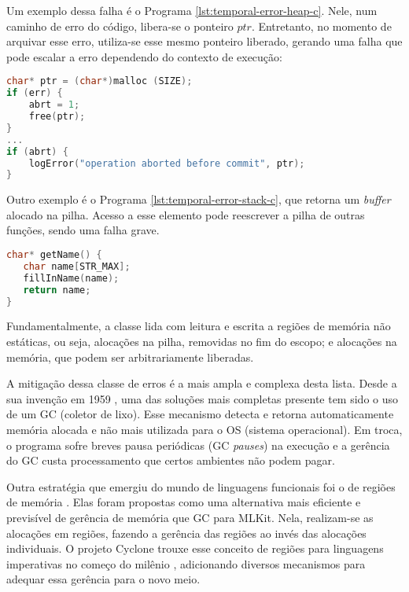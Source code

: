 Um exemplo dessa falha é o Programa \ref{lst:temporal-error-heap-c}. Nele, num caminho de erro do código, libera-se o ponteiro $ptr$. Entretanto, no momento de arquivar esse erro, utiliza-se esse mesmo ponteiro liberado, gerando uma falha que pode escalar a erro dependendo do contexto de execução:
\begin{lstlisting}[language=C, label={lst:temporal-error-heap-c}, caption=Exemplo de uma Falha Temporal na \emph{Heap}]
char* ptr = (char*)malloc (SIZE);  
if (err) {
	abrt = 1;  
	free(ptr);
}  
...  
if (abrt) {
	logError("operation aborted before commit", ptr);
}
\end{lstlisting}

Outro exemplo é o Programa \ref{lst:temporal-error-stack-c}, que retorna um \emph{buffer} alocado na pilha. Acesso a esse elemento pode reescrever a pilha de outras funções, sendo uma falha grave.

\begin{lstlisting}[language=C, label={lst:temporal-error-stack-c}, caption=Exemplo de uma Falha Temporal na Pilha]
char* getName() {
   char name[STR_MAX];  
   fillInName(name);  
   return name;
}
\end{lstlisting}

Fundamentalmente, a classe lida com leitura e escrita a regiões de memória não estáticas, ou seja, alocações na pilha, removidas no fim do escopo; e alocações na memória, que podem ser arbitrariamente liberadas.


\label{sec:mem-error:GC}
A mitigação dessa classe de erros é a mais ampla e complexa desta lista. Desde a sua invenção em 1959 \cite{GCSTART}, uma das soluções mais completas presente tem sido o uso de um GC (coletor de lixo). Esse mecanismo detecta e retorna automaticamente memória alocada e não mais utilizada para o OS (sistema operacional). Em troca, o programa sofre breves pausa periódicas (GC \emph{pauses}) na execução e a gerência do GC custa processamento que certos ambientes não podem pagar.

\label{sec:mem-error:MemReg}
Outra estratégia que emergiu do mundo de linguagens funcionais foi o de regiões de memória \cite{REGMEM}. Elas foram propostas como uma alternativa mais eficiente e previsível de gerência de memória que GC para MLKit. Nela, realizam-se as alocações em regiões, fazendo a gerência das regiões ao invés das alocações individuais. O projeto Cyclone trouxe esse conceito de regiões para linguagens imperativas no começo do milênio \cite{CYCLONEMEM}, adicionando diversos mecanismos para adequar essa gerência para o novo meio.

